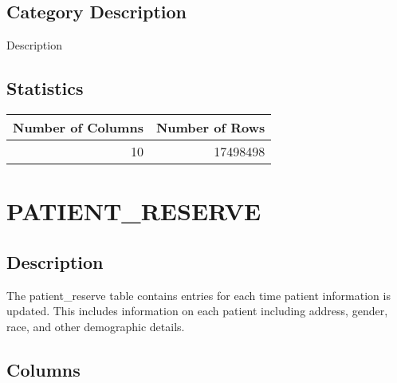 \documentclass[
  letterpaper,
  DIV=11,
  numbers=noendperiod]{scrreprt}
\begin{document}
\hypertarget{category-description-28}{%
\section*{Category Description}\label{category-description-28}}

Description

\hypertarget{statistics-28}{%
\section*{Statistics}\label{statistics-28}}

\begin{longtable}{rr}
\toprule
Number of Columns & Number of Rows \\ 
\midrule
10 & 17498498 \\ 
\bottomrule
\end{longtable}

\hypertarget{patient_reserve}{%
\chapter*{PATIENT\_RESERVE}\label{patient_reserve}}

\hypertarget{description-29}{%
\section*{Description}\label{description-29}}

The patient\_reserve table contains entries for each time patient
information is updated. This includes information on each patient
including address, gender, race, and other demographic details.

\hypertarget{columns-29}{%
\section*{Columns}\label{columns-29}}
\end{document}
